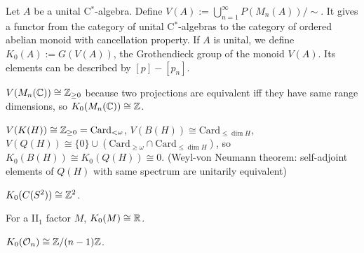 \documentclass{../../large}
\begin{document}
\begin{prb}
Let $A$ be a unital C$^*$-algebra.
Define $V(A):=\bigcup_{n=1}^\infty P(M_n(A))/\sim$.
It gives a functor from the category of unital C$^*$-algebras to the category of ordered abelian monoid with cancellation property.
If $A$ is unital, we define $K_0(A):=G(V(A))$, the Grothendieck group of the monoid $V(A)$.
Its elements can be described by $[p]-[p_n]$.
\begin{parts}
\item $V(M_n(\mathbb{C}))\cong\mathbb{Z}_{\ge0}$ because two projections are equivalent iff they have same range dimensions, so $K_0(M_n(\mathbb{C}))\cong\mathbb{Z}$.
\item $V(K(H))\cong\mathbb{Z}_{\ge0}=\mathrm{Card}_{<\omega}$, $V(B(H))\cong\mathrm{Card}_{\le\dim H}$, $V(Q(H))\cong\{0\}\cup(\mathrm{Card}_{\ge\omega}\cap\mathrm{Card}_{\le\dim H})$, so $K_0(B(H))\cong K_0(Q(H))\cong0$. (Weyl-von Neumann theorem: self-adjoint elements of $Q(H)$ with same spectrum are unitarily equivalent)
\item $K_0(C(S^2))\cong\mathbb{Z}^2$.
\item For a II$_1$ factor $M$, $K_0(M)\cong\mathbb{R}$.
\item $K_0(\mathcal{O}_n)\cong\mathbb{Z}/(n-1)\mathbb{Z}$.
\end{parts}
\end{prb}
\end{document}
